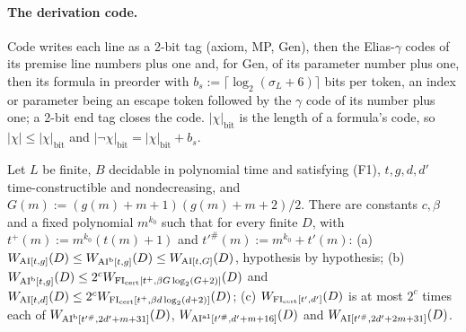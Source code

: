 \paragraph{The derivation code.} $\mathrm{Code}$ writes each line as a 2-bit tag (axiom, MP, Gen), then the Elias-$\gamma$ codes \citep{elias1975universal} of its premise line numbers plus one and, for Gen, of its parameter number plus one, then its formula in preorder with $b_s:=\lceil\log_2(\sigma_L+6)\rceil$ bits per token, an index or parameter being an escape token followed by the $\gamma$ code of its number plus one; a 2-bit end tag closes the code. $|\chi|_{\mathrm{bit}}$ is the length of a formula's code, so $|\chi|\le|\chi|_{\mathrm{bit}}$ and $|\neg\chi|_{\mathrm{bit}}=|\chi|_{\mathrm{bit}}+b_s$.

\begin{proposition}\label{prop:time:budgets}
Let $L$ be finite, $B$ decidable in polynomial time and satisfying (F1), $t,g,d,d'$ time-constructible and nondecreasing, and $G(m):=(g(m)+m+1)(g(m)+m+2)/2$. There are constants $c,\beta$ and a fixed polynomial $m^{k_0}$ such that for every finite $D$, with $t^+(m):=m^{k_0}(t(m)+1)$ and $t'^\#(m):=m^{k_0}+t'(m)$:
(a) $W_{\mathrm{AI}[t,g]}(D)\le W_{\mathrm{AI}^{\mathrm b}[t,g]}(D)\le W_{\mathrm{AI}[t,G]}(D)$, hypothesis by hypothesis;
(b) $W_{\mathrm{AI}^{\mathrm b}[t,g]}(D)\le2^cW_{\mathrm{FI}_{\mathrm{cert}}[t^+,\beta G\log_2(G+2)]}(D)$ and $W_{\mathrm{AI}[t,d]}(D)\le2^cW_{\mathrm{FI}_{\mathrm{cert}}[t^+,\beta d\log_2(d+2)]}(D)$;
(c) $W_{\mathrm{FI}_{\mathrm{cert}}[t',d']}(D)$ is at most $2^c$ times each of $W_{\mathrm{AI}^{\mathrm b}[t'^\#,2d'+m+31]}(D)$, $W_{\mathrm{AI}^{\mathrm{a1}}[t'^\#,d'+m+16]}(D)$ and $W_{\mathrm{AI}[t'^\#,2d'+2m+31]}(D)$.
\end{proposition}

